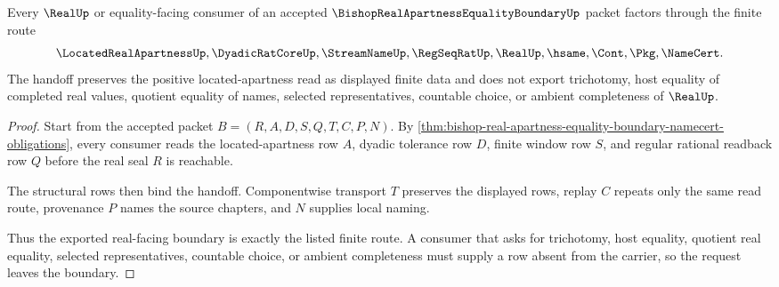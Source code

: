 \begin{theorem}
\label{thm:bishop-real-apartness-equality-boundary-real-handoff}
Every $\RealUp$ or equality-facing consumer of an accepted $\BishopRealApartnessEqualityBoundaryUp$ packet factors through the finite route
$$
\LocatedRealApartnessUp,\DyadicRatCoreUp,\StreamNameUp,\RegSeqRatUp,\RealUp,\hsame,\Cont,\Pkg,\NameCert .
$$
The handoff preserves the positive located-apartness read as displayed finite data and does not export trichotomy, host equality of completed real values, quotient equality of names, selected representatives, countable choice, or ambient completeness of $\RealUp$.
\end{theorem}
\begin{proof}
Start from the accepted packet $B=(R,A,D,S,Q,T,C,P,N)$. By \autoref{thm:bishop-real-apartness-equality-boundary-namecert-obligations}, every consumer reads the located-apartness row $A$, dyadic tolerance row $D$, finite window row $S$, and regular rational readback row $Q$ before the real seal $R$ is reachable.

The structural rows then bind the handoff. Componentwise transport $T$ preserves the displayed rows, replay $C$ repeats only the same read route, provenance $P$ names the source chapters, and $N$ supplies local naming.

Thus the exported real-facing boundary is exactly the listed finite route. A consumer that asks for trichotomy, host equality, quotient real equality, selected representatives, countable choice, or ambient completeness must supply a row absent from the carrier, so the request leaves the boundary.
\end{proof}



